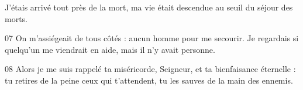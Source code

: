 J’étais arrivé tout près de la mort, ma vie était descendue au seuil du séjour des morts.

07 On m’assiégeait de tous côtés : aucun homme pour me secourir. Je regardais si quelqu’un me viendrait en aide, mais il n’y avait personne.

08 Alors je me suis rappelé ta miséricorde, Seigneur, et ta bienfaisance éternelle : tu retires de la peine ceux qui t’attendent, tu les sauves de la main des ennemis.
